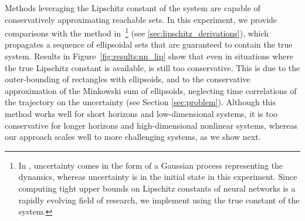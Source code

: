 \documentclass{article}
\begin{document}
Methods leveraging the Lipschitz constant of the system are capable of conservatively approximating reachable sets. In this experiment, we provide comparisons with the method in~\citep{koller2018}\footnote{In \citep{koller2018}, uncertainty comes in the form of a Gaussian process representing the dynamics, whereas uncertainty is in the initial state in this experiment. 
Since computing tight upper bounds on Lipschitz constants of neural networks is a rapidly evolving field of research, we implement \citep{koller2018} using the true constant of the system.} (see \ref{sec:lipschitz_derivations}), 
which propagates a sequence of ellipsoidal sets that are guaranteed to contain the true system. 
Results in Figure~\ref{fig:results:nn_lip} show that even in situations where the true Lipschitz constant is available, \citep{koller2018} is still too conservative. This is due to the outer-bounding of rectangles with ellipsoids, and to the conservative approximation of the Minkowski sum of ellipsoids, neglecting time correlations of the trajectory on the uncertainty (see Section \ref{sec:problem}). 
Although this method works well for short horizons and low-dimensional systems, 
it is too conservative for longer horizons and high-dimensional nonlinear systems, whereas our approach scales well to more challenging systems, as we show next.

\vspace{-0.5mm}
\end{document}
